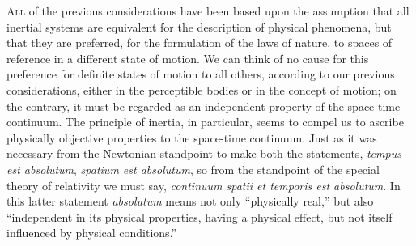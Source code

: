 \documentclass[12pt]{book}[2005/09/16]
\newcommand{\First}[1]{\textsc{\large #1}}
\begin{document}
\First{All} of the previous considerations have been based
upon the assumption that all inertial systems are
equivalent for the description of physical phenomena, but
that they are preferred, for the formulation of the laws
of nature, to spaces of reference in a different state of
motion. We can think of no cause for this preference
for definite states of motion to all others, according to
our previous considerations, either in the perceptible
bodies or in the concept of motion; on the contrary, it
must be regarded as an independent property of the
space-time continuum. The principle of inertia, in
particular, seems to compel us to ascribe physically
objective properties to the space-time continuum. Just
as it was necessary from the Newtonian standpoint to
make both the statements, \textit{tempus est absolutum}, \textit{spatium
est absolutum}, so from the standpoint of the special theory
of relativity we must say, \textit{continuum spatii et temporis est
absolutum}. In this latter statement \textit{absolutum} means not
only ``physically real,'' but also ``independent in its
physical properties, having a physical effect, but not itself
influenced by physical conditions.''
\end{document}
